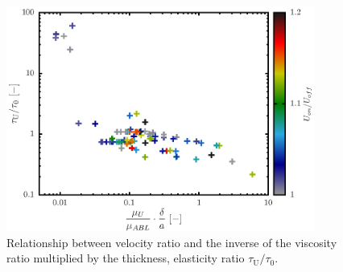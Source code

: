 \begin{figure}[h]
    \centering
    \includegraphics[width=0.9\textwidth]{5-Results/elastcity_color.eps}
    \caption{Relationship between velocity ratio and the inverse of the viscosity ratio multiplied by the thickness, elasticity ratio $\tau_\text{U}/\tau_\text{0}$.}
    \label{fig:elastcityColor}
\end{figure}
